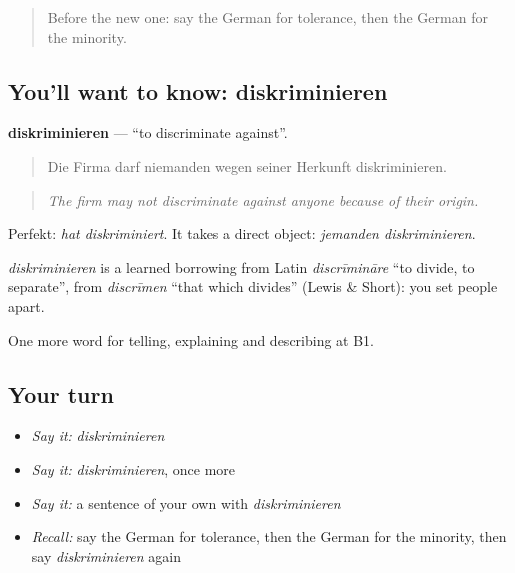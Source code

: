 \begin{quote}
Before the new one: say the German for tolerance, then the German for the minority.
\end{quote}

\subsection*{You'll want to know: diskriminieren}
\textbf{diskriminieren} — \textquotedblleft{}to discriminate against\textquotedblright{}.

\begin{quote}
Die Firma darf niemanden wegen seiner Herkunft diskriminieren.
\end{quote}

\begin{quote}
\emph{The firm may not discriminate against anyone because of their origin.}
\end{quote}

Perfekt: \emph{hat diskriminiert}. It takes a direct object: \emph{jemanden diskriminieren}.

\begin{cousinweb}
\emph{diskriminieren} is a learned borrowing from Latin \emph{discrīmināre} \textquotedblleft{}to divide, to separate\textquotedblright{}, from \emph{discrīmen} \textquotedblleft{}that which divides\textquotedblright{} (Lewis \& Short): you set people apart.
\end{cousinweb}

\begin{grammarlens}[title={What you've built}]
One more word for telling, explaining and describing at B1.
\end{grammarlens}

\subsection*{Your turn}
\begin{itemize}
\raggedright
  \item \emph{Say it:} \emph{diskriminieren}
  \item \emph{Say it:} \emph{diskriminieren}, once more
  \item \emph{Say it:} a sentence of your own with \emph{diskriminieren}
  \item \emph{Recall:} say the German for tolerance, then the German for the minority, then say \emph{diskriminieren} again
\end{itemize}

